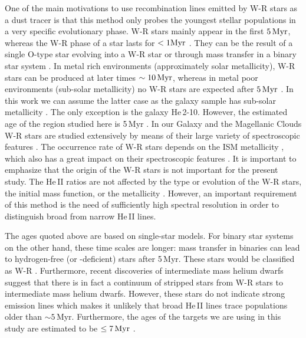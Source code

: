 \documentclass[linenumbers]{aastex63}
\begin{document}
One of the main motivations to use recombination lines emitted by W-R stars as a dust tracer is that this method only probes the youngest stellar populations in a very specific evolutionary phase.
W-R stars mainly appear in the first ${\rm 5\,Myr}$, whereas the W-R phase of a star lasts for $< 1 {\rm Myr}$ \citep{meynet_stellar_2005}.
They can be the result of a single O-type star evolving into a W-R star \citep{meynet_massive_2017} or through mass transfer in a binary star system \citep{eldridge_binary_2017}. 
In metal rich environments (approximately solar metallicity), W-R stars can be produced at later times $\sim {\rm 10\,Myr}$, whereas in metal poor environments (sub-solar metallicity) no W-R stars are expected after ${\rm 5\,Myr}$ \citep[see Figure\,14 in ][]{leitherer_effects_2014}. In this work we can assume the latter case as the galaxy sample has sub-solar metallicity \citep[see Table\,1 in][]{chandar_ngc_2004}. The only exception is the galaxy He\,2-10. However, the estimated age of the region studied here is 5\,Myr \citep[see Table\,2 in][]{chandar_ngc_2004}.
In our Galaxy and the Magellanic Clouds W-R stars are studied extensively by means of their large variety of spectroscopic features \citep{crowther_physical_2007}. 
The occurrence rate of W-R stars depends on the ISM metallicity \citep{conti_evolution_1983, van_der_hucht_viith_2001}, which also has a great impact on their spectroscopic features \citep{mokiem_empirical_2007}.
It is important to emphasize that the origin of the W-R stars is not important for the present study. The He\,II ratios are not affected by the type or evolution of the W-R stars, the initial mass function, or the metallicity \citep{leitherer_he_2019}. 
However, an important requirement of this method is the need of sufficiently high spectral resolution in order to distinguish broad from narrow He\,II lines. 

The ages quoted above are based on single-star models. For binary star systems on the other hand, these time scales are longer: 
mass transfer in binaries can lead to hydrogen-free (or -deficient) stars after 5\,Myr. These stars would be classified as W-R \citep{xiao_emission-line_2018}. 
Furthermore, recent discoveries of intermediate mass helium dwarfs \citep{drout_discovery_2023,gotberg_stellar_2023} suggest that there is in fact a continuum of stripped stars from W-R stars to intermediate mass helium dwarfs. However, these stars do not indicate strong emission lines which makes it unlikely that broad He\,II lines trace populations older than $\sim5\,$Myr. Furthermore, the ages of the targets we are using in this study are estimated to be $\leq {\rm 7\,Myr}$ \citep[][their Table\,2]{chandar_ngc_2004}.
\end{document}

